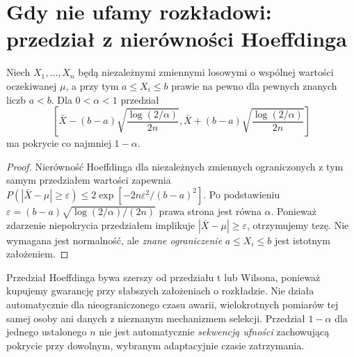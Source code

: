 \section{Gdy nie ufamy rozkładowi: przedział z nierówności Hoeffdinga}
\begin{twierdzenie}
\label{thm:hoeffding-ci}
Niech $X_1,\ldots,X_n$ będą niezależnymi zmiennymi
losowymi o wspólnej wartości oczekiwanej $\mu$,
a przy tym $a\le X_i\le b$ prawie na pewno dla
pewnych znanych liczb $a<b$. Dla $0<\alpha<1$
przedział
\[
 \left[\bar X-(b-a)\sqrt{\frac{\log(2/\alpha)}{2n}},
       \bar X+(b-a)\sqrt{\frac{\log(2/\alpha)}{2n}}\right]
\]
ma pokrycie co najmniej $1-\alpha$.
\end{twierdzenie}
\begin{proof}
Nierówność Hoeffdinga dla niezależnych zmiennych
ograniczonych z tym samym przedziałem wartości zapewnia
$P(|\bar X-\mu|\ge\varepsilon)
\le2\exp[-2n\varepsilon^2/(b-a)^2]$.
Po podstawieniu
$\varepsilon=(b-a)\sqrt{\log(2/\alpha)/(2n)}$
prawa strona jest równa $\alpha$. Ponieważ zdarzenie
niepokrycia przedziałem implikuje
$|\bar X-\mu|\ge\varepsilon$, otrzymujemy tezę.
Nie wymagana jest normalność, ale \emph{znane ograniczenie}
$a\le X_i\le b$ jest istotnym założeniem.
\end{proof}

\begin{uwaga}
Przedział Hoeffdinga bywa szerszy od przedziału t lub Wilsona,
ponieważ kupujemy gwarancję przy słabszych założeniach
o rozkładzie. Nie działa automatycznie dla nieograniczonego
czasu awarii, wielokrotnych pomiarów tej samej osoby ani
danych z nieznanym mechanizmem selekcji.
Przedział $1-\alpha$ dla jednego ustalonego $n$ nie jest
automatycznie \emph{sekwencją ufności} zachowującą pokrycie
przy dowolnym, wybranym adaptacyjnie czasie zatrzymania.
\end{uwaga}

